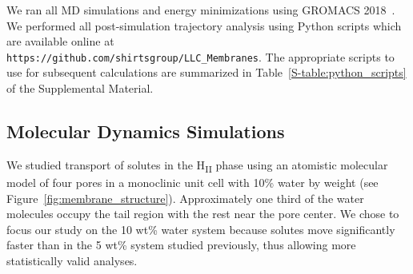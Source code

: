 \documentclass[aps,pre,preprint,groupedaddress,longbibliography]{revtex4-2}
\begin{document}
  We ran all MD simulations and energy minimizations using GROMACS
  2018~\cite{bekker_gromacs:_1993,berendsen_gromacs:_1995,van_der_spoel_gromacs:_2005,hess_gromacs_2008}.
  We performed all post-simulation trajectory analysis using Python scripts
  which are available online at \\
  \texttt{https://github.com/shirtsgroup/LLC\_Membranes}.  The appropriate
  scripts to use for subsequent calculations are summarized in
  Table~\ref{S-table:python_scripts} of the Supplemental Material.
  
  \subsection{Molecular Dynamics Simulations}

  We studied transport of solutes in the H\textsubscript{II} phase using an
  atomistic molecular model of four pores in a monoclinic unit cell with 10\%
  water by weight (see Figure~\ref{fig:membrane_structure}). Approximately one
  third of the water molecules occupy the tail region with the rest near the
  pore center. We chose to focus our study on the 10 wt\% water system because
  solutes move significantly faster than in the 5 wt\% system studied
  previously, thus allowing more statistically valid analyses.
  
\end{document}
